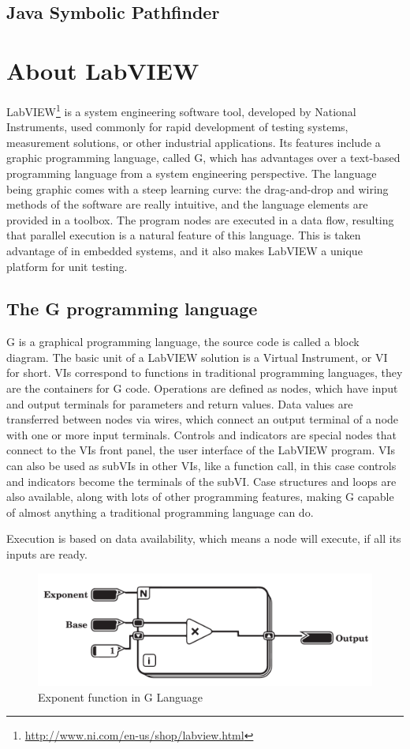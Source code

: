 \subsection{Java Symbolic Pathfinder}
\cite{Pasareanu2013SymbolicPI}
\section{About LabVIEW}
LabVIEW\footnote{\url{http://www.ni.com/en-us/shop/labview.html}} is a system engineering software tool, developed by National Instruments, used commonly for rapid development of testing systems, measurement solutions, or other industrial applications. Its features include a graphic programming language, called G, which has advantages over a text-based programming language from a system engineering perspective. The language being graphic comes with a steep learning curve: the drag-and-drop and wiring methods of the software are really intuitive, and the language elements are provided in a toolbox. The program nodes are executed in a data flow, resulting that parallel execution is a natural feature of this language. This is taken advantage of in embedded systems, and it also makes LabVIEW a unique platform for unit testing.
\subsection{The G programming language}
G is a graphical programming language, the source code is called a block diagram. The basic unit of a LabVIEW solution is a Virtual Instrument, or VI for short. VIs correspond to functions in traditional programming languages, they are the containers for G code. Operations are defined as nodes, which have input and output terminals for parameters and return values. Data values are transferred between nodes via wires, which connect an output terminal of a node with one or more input terminals. Controls and indicators are special nodes that connect to the VIs front panel, the user interface of the LabVIEW program. VIs can also be used as subVIs in other VIs, like a function call, in this case controls and indicators become the terminals of the subVI. Case structures and loops are also available, along with lots of other programming features, making G capable of almost anything a traditional programming language can do.

Execution is based on data availability, which means a node will execute, if all its inputs are ready. 
\begin{figure}

\includegraphics[width=150mm,keepaspectratio]{figures/vi2.pdf}
\caption{Exponent function in G Language} 
\label{fig:gexponent}
\end{figure}

